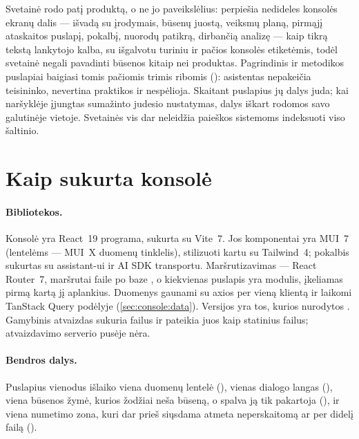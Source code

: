 Svetainė rodo patį produktą, o ne jo paveikslėlius:  perpiešia nedideles
konsolės ekranų dalis --- išvadą su įrodymais, būsenų juostą, veiksmų planą, pirmąjį ataskaitos
puslapį, pokalbį, nuorodų patikrą, dirbančią analizę --- kaip tikrą tekstą lankytojo kalba, su
išgalvotu turiniu ir pačios konsolės etiketėmis, todėl svetainė negali pavadinti būsenos kitaip
nei produktas. Pagrindinis ir metodikos puslapiai baigiasi tomis pačiomis trimis ribomis
(): asistentas nepakeičia teisininko, nevertina praktikos ir nespėlioja.
Skaitant puslapius jų dalys juda; kai naršyklėje įjungtas sumažinto judesio nustatymas, dalys
iškart rodomos savo galutinėje vietoje. Svetainės  vis dar neleidžia paieškos sistemoms
indeksuoti viso šaltinio.

\section{Kaip sukurta konsolė}\label{sec:console:built}

\paragraph{Bibliotekos.} Konsolė yra React~19 programa, sukurta su Vite~7. Jos komponentai yra
MUI~7 (lentelėms --- MUI~X duomenų tinklelis), stilizuoti kartu su Tailwind~4; pokalbis sukurtas
su assistant-ui ir AI SDK transportu. Maršrutizavimas --- React Router~7, maršrutai faile
 po baze , o kiekvienas puslapis yra modulis, įkeliamas pirmą
kartą jį aplankius. Duomenys gaunami su axios per vieną klientą ir laikomi TanStack Query podėlyje
(\cref{sec:console:data}). Versijos yra tos, kurios nurodytos .
Gamybinis atvaizdas sukuria failus ir pateikia juos kaip statinius failus; atvaizdavimo serverio
pusėje nėra.

\paragraph{Bendros dalys.} Puslapius vienodus išlaiko viena duomenų lentelė
(), vienas dialogo langas
(), viena būsenos žymė, kurios žodžiai neša
būseną, o spalva ją tik pakartoja (), ir viena
numetimo zona, kuri dar prieš siųsdama atmeta neperskaitomą ar per didelį failą
().

